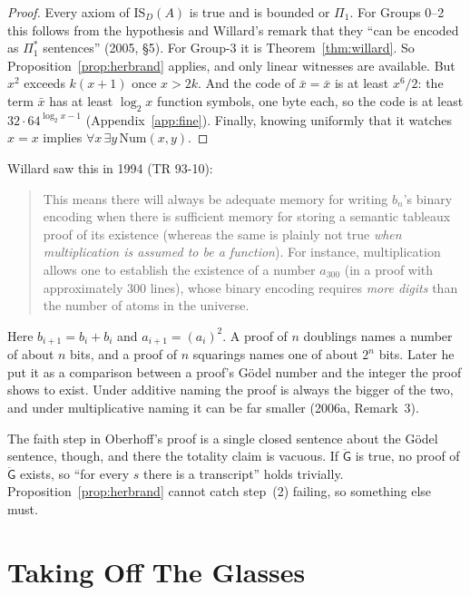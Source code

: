 \documentclass[11pt]{article}
\newcommand{\G}{\ddot{\mathsf{G}}}          %
\newcommand{\ISD}{\mathrm{IS}_D(A)}
\theoremstyle{plain}
\theoremstyle{definition}
\begin{document}
\begin{proof}
Every axiom of $\ISD$ is true and is bounded or $\Pi_1$. For Groups 0--2 this
follows from the hypothesis and Willard's remark that they ``can be encoded
as $\Pi_1^*$ sentences'' (2005, \S5). For Group-3 it is
Theorem~\ref{thm:willard}. So Proposition~\ref{prop:herbrand} applies, and
only linear witnesses are available. But $x^2$ exceeds $k(x+1)$ once $x > 2k$.
And the code of $\bar x = \bar x$ is at least $x^6/2$: the term $\bar x$ has
at least $\log_2 x$ function symbols, one byte each, so the code is at least
$32 \cdot 64^{\log_2 x - 1}$ (Appendix~\ref{app:fine}). Finally, knowing
uniformly that it watches $x = x$ implies $\forall x\,\exists
y\,\mathrm{Num}(x,y)$.
\end{proof}

\noindent
Willard saw this in 1994 (TR 93-10):
\begin{quote}\small
This means there will always be adequate memory for writing $b_n$'s binary
encoding when there is sufficient memory for storing a semantic tableaux
proof of its existence (whereas the same is plainly not true \emph{when
multiplication is assumed to be a function}). For instance, multiplication
allows one to establish the existence of a number $a_{300}$ (in a proof with
approximately 300 lines), whose binary encoding requires \emph{more digits}
than the number of atoms in the universe.
\end{quote}
Here $b_{i+1} = b_i + b_i$ and $a_{i+1} = (a_i)^2$. A proof of $n$ doublings
names a number of about $n$ bits, and a proof of $n$ squarings names one of
about $2^n$ bits. Later he put it as a comparison between a proof's Gödel
number and the integer the proof shows to exist. Under additive naming the
proof is always the bigger of the two, and under multiplicative naming it can
be far smaller (2006a, Remark~3).

The faith step in Oberhoff's proof is a single closed sentence about the
Gödel sentence, though, and there the totality claim is vacuous. If $\G$ is
true, no proof of $\G$ exists, so ``for every $s$ there is a transcript''
holds trivially. Proposition~\ref{prop:herbrand} cannot catch step~(2)
failing, so something else must.

\section{Taking Off The Glasses}
\label{sec:backwards}
\end{document}
